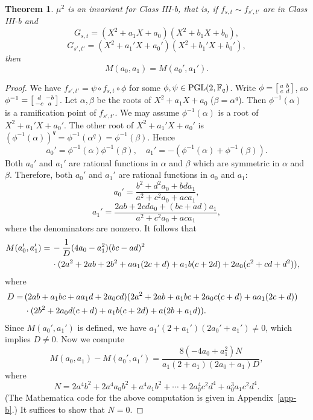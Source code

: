 \documentclass{amsart}
\newtheorem{thm}{Theorem}[section]
\numberwithin{equation}{section}
\theoremstyle{definition}
\newcommand{\f}{\Bbb F}
\newcommand{\pgl}{\mathrm{PGL}}
\begin{document}
\begin{thm}\label{thm:mu2}
$\mu^2$ is an invariant for Class III-b, that is, if $f_{s,t}\sim f_{s',t'}$ are in Class III-b and
\[
G_{s,t}=(X^2+a_1X+a_0)(X^2+b_1X+b_0),
\]
\[
G_{s',t'}=(X^2+a_1'X+a_0')(X^2+b_1'X+b_0'),
\]
then
\[
M(a_0,a_1)=M(a_0',a_1').
\]
\end{thm}

\begin{proof}
We have $f_{s',t'}=\psi\circ f_{s,t}\circ\phi$ for some $\phi,\psi\in\pgl(2,\f_q)$. Write $\phi=\left[\begin{smallmatrix}a&b\cr c&d\end{smallmatrix}\right]$, so $\phi^{-1}=\left[\begin{smallmatrix}d&-b\cr -c&a\end{smallmatrix}\right]$. Let $\alpha,\beta$ be the roots of $X^2+a_1X+a_0$ ($\beta=\alpha^q$). Then $\phi^{-1}(\alpha)$ is a ramification point of $f_{s',t'}$. We may assume $\phi^{-1}(\alpha)$ is a root of $X^2+a_1'X+a_0'$. The other root of $X^2+a_1'X+a_0'$ is $(\phi^{-1}(\alpha))^q=\phi^{-1}(\alpha^q)=\phi^{-1}(\beta)$. Hence
\[
a_0'=\phi^{-1}(\alpha)\phi^{-1}(\beta),\quad a_1'=-(\phi^{-1}(\alpha)+\phi^{-1}(\beta)).
\]
Both $a_0'$ and $a_1'$ are rational functions in $\alpha$ and $\beta$ which are symmetric in $\alpha$ and $\beta$. Therefore, both $a_0'$ and $a_1'$ are rational functions in $a_0$ and $a_1$: 
\[
a_0'=\frac{b^2+d^2 a_0+b d a_1}{a^2+c^2 a_0+a c a_1},
\]
\begin{equation}\label{a11}
a_1'=\frac{2 a b+2 c d a_0+(b c+a d) a_1}{a^2+c^2 a_0+a c a_1},
\end{equation}
where the denominators are nonzero. It follows that 
\begin{align*}
M(a_0',a_1')=\,&
-\frac 1D (4 a_0-a_1^2) (b c-a d)^2\cr
&\cdot (2 a^2+2 a b+2 b^2+a a_1 (2 c+d)+a_1 b (c+2 d)+2 a_0 (c^2+c d+d^2)),
\end{align*}
where
\begin{align*}
D=\,&(2 a b+a_1 b c+a a_1 d+2 a_0 c d) (2 a^2+2 a b+a_1 b c+2 a_0 c (c+d)+a a_1 (2 c+d))\cr
&\cdot (2 b^2+2 a_0 d (c+d)+a_1 b (c+2 d)+a (2 b+a_1 d)).
\end{align*}
Since $M(a_0',a_1')$ is defined, we have $a_1'(2+a_1')(2a_0'+a_1')\ne0$, which implies $D\ne 0$. Now we compute
\[
M(a_0,a_1)-M(a_0',a_1')=\frac{8 (-4 a_0+a_1^2)N}{a_1 (2 + a_1) (2 a_0 + a_1)D},
\]
where
\begin{equation}\label{N}
N=2 a^4 b^2 + 2 a^4 a_0 b^2 + a^4 a_1 b^2 +\cdots +2 a_0^4 c^2 d^4+a_0^3 a_1 c^2 d^4.
\end{equation}
(The Mathematica code for the above computation is given in Appendix~\ref{app-b}.) It suffices to show that $N=0$.


\end{proof}
\end{document}
